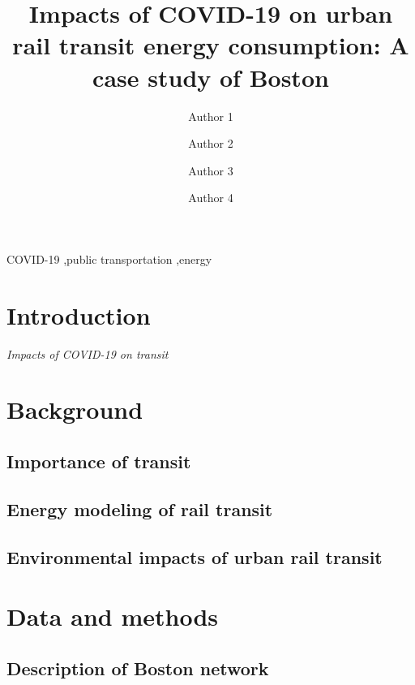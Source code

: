 \documentclass[ review, 11pt]{elsarticle}
\newcommand{\?}{\stackrel{?}{=}}
\begin{document}
 
 
\begin{frontmatter}
  
\title{Impacts of COVID-19 on urban rail transit energy consumption: A case study of Boston}
\author[umass]{Author 1}
\author[umass]{Author 2} 
\author[umass]{Author 3}
\author[umass]{Author 4}


\address[umass]{Department of Civil and Environmental Engineering, University of Massachusetts Amherst, MA 01003, United States}

\begin{abstract}
\end{abstract}

\begin{keyword}
  COVID-19 \sep public transportation \sep energy
\end{keyword}

\end{frontmatter}

\section{Introduction}
{\it Impacts of COVID-19 on transit}

\section{Background}
\subsection{Importance of transit}

\subsection{Energy modeling of rail transit}

\subsection{Environmental impacts of urban rail transit}

\section{Data and methods}
\subsection{Description of Boston network}
\end{document}

